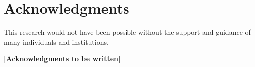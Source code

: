 
\chapter*{Acknowledgments}

This research would not have been possible without the support and guidance of many individuals and institutions.

\textbf{[Acknowledgments to be written]}

%
%
%
%

